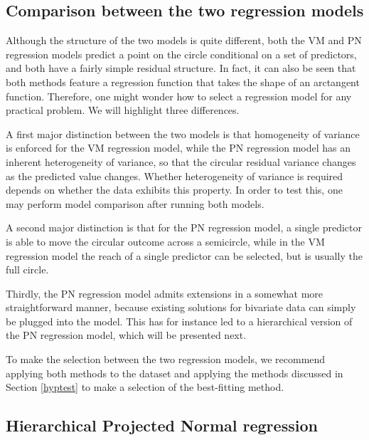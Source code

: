 \hypertarget{comparison-between-the-two-regression-models}{%
\subsection{Comparison between the two regression
models}\label{comparison-between-the-two-regression-models}}

Although the structure of the two models is quite different, both the VM
and PN regression models predict a point on the circle conditional on a
set of predictors, and both have a fairly simple residual structure. In
fact, it can also be seen that both methods feature a regression
function that takes the shape of an arctangent function. Therefore, one
might wonder how to select a regression model for any practical problem.
We will highlight three differences.

A first major distinction between the two models is that homogeneity of
variance is enforced for the VM regression model, while the PN
regression model has an inherent heterogeneity of variance, so that the
circular residual variance changes as the predicted value changes.
Whether heterogeneity of variance is required depends on whether the
data exhibits this property. In order to test this, one may perform
model comparison after running both models.

A second major distinction is that for the PN regression model, a single
predictor is able to move the circular outcome across a semicircle,
while in the VM regression model the reach of a single predictor can be
selected, but is usually the full circle.

Thirdly, the PN regression model admits extensions in a somewhat more
straightforward manner, because existing solutions for bivariate data
can simply be plugged into the model. This has for instance led to a
hierarchical version of the PN regression model, which will be presented
next.

To make the selection between the two regression models, we recommend
applying both methods to the dataset and applying the methods discussed
in Section \ref{hyptest} to make a selection of the best-fitting method.

\hypertarget{hierarchical-projected-normal-regression}{%
\subsection{Hierarchical Projected Normal
regression}\label{hierarchical-projected-normal-regression}}

